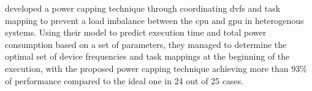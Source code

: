 			\textcite{Komoda2013} developed a power capping technique through coordinating \gls{dvfs} and task mapping to prevent a load imbalance between the \gls{cpu} and \gls{gpu} in heterogenous systems.
			Using their model to predict execution time and total power consumption based on a set of parameters, they managed to determine the optimal set of device frequencies and task mappings at the beginning of the execution, with the proposed power capping technique achieving more than $93 \%$ of performance compared to the ideal one in 24 out of 25 cases.